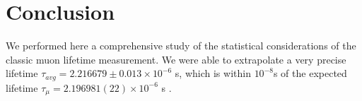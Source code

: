 \section*{\bf Conclusion}
We performed here a comprehensive study of the statistical considerations of the classic muon lifetime measurement. We were able to extrapolate a very precise lifetime $\tau_{avg} = 2.216679 \pm 0.013 \times 10^{-6}$ s, which is within $10^{-8}$s of the expected lifetime \mbox{$\tau_\mu = 2.196981(22) \times 10^{-6}$} s \cite{ber}\cite{pat}.
